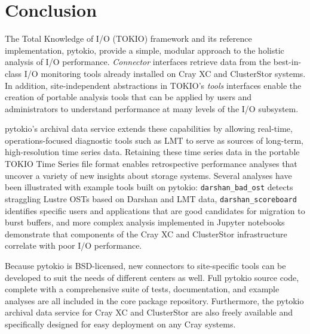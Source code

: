 \section{Conclusion}

The Total Knowledge of I/O (TOKIO) framework and its reference implementation, pytokio, provide a simple, modular approach to the holistic analysis of I/O performance.
\emph{Connector} interfaces retrieve data from the best-in-class I/O monitoring tools already installed on Cray XC and ClusterStor systems.
In addition, site-independent abstractions in TOKIO's \emph{tools} interfaces enable the creation of portable analysis tools that can be applied by users and administrators to understand performance at many levels of the I/O subsystem.

pytokio's archival data service extends these capabilities by allowing real-time, operations-focused diagnostic tools such as LMT to serve as sources of long-term, high-resolution time series data.
Retaining these time series data in the portable TOKIO Time Series file format enables retrospective performance analyses that uncover a variety of new insights about storage systems.
Several analyses have been illustrated with example tools built on pytokio:
\texttt{darshan\_bad\_ost} detects straggling Lustre OSTs based on Darshan and LMT data, \texttt{darshan\_scoreboard} identifies specific users and applications that are good candidates for migration to burst buffers, and more complex analysis implemented in Jupyter notebooks demonstrate that components of the Cray XC and ClusterStor infrastructure correlate with poor I/O performance.

Because pytokio is BSD-licensed, new connectors to site-specific tools can be developed to suit the needs of different centers as well.
Full pytokio source code, complete with a comprehensive suite of tests, documentation, and example analyses are all included in the core package repository.
Furthermore, the pytokio archival data service for Cray XC and ClusterStor are also freely available and specifically designed for easy deployment on any Cray systems.